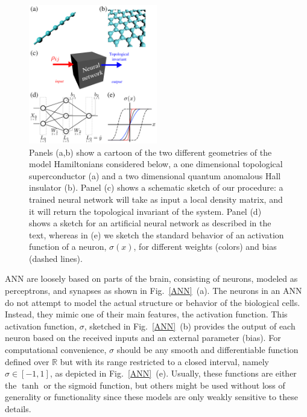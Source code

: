 \begin{figure}[ht!]
\centering
\includegraphics[width=0.5\textwidth]{ann/figures/fig1.pdf}
\vspace{-5pt}
\caption{
Panels (a,b) show a cartoon of the two different geometries of the model Hamiltonians considered  below, 
a one dimensional topological superconductor  (a) and a two dimensional  quantum anomalous Hall insulator (b).
Panel (c) shows a schematic sketch of our procedure: a trained neural network
will take as input a local density matrix, and it will return the topological
invariant of the system.
Panel (d) shows a sketch for an artificial neural network as described in the text, whereas
in (e) we sketch the standard behavior of an activation function of a neuron,
$\sigma(x)$, for different weights (colors) and bias (dashed lines).
}
\label{ANN}
\label{fig1}
\end{figure}

ANN are loosely based on parts of the brain, consisting of neurons, modeled as
perceptrons\cite{Rosenblatt1958}, and synapses as shown in Fig.~\ref{ANN}~(a).
The neurons in an ANN do not attempt to model the actual structure or behavior
of the biological cells\cite{Hodgkin1952}. Instead, they mimic one of their main
features, the activation function.
This activation function, $\sigma$, sketched in Fig.~\ref{ANN}~(b) provides the
output of each neuron based on the received inputs and an external parameter
(bias). For computational convenience, $\sigma$ should be any smooth and
differentiable function defined over $\mathbb{R}$ but with its range restricted
to a closed interval, namely $\sigma\in[-1,1]$, as depicted in Fig.~\ref{ANN}~(e).
Usually, these functions are either the $\tanh$ or the sigmoid function, but
others might be used without loss of generality or functionality since these
models are only weakly sensitive to these details.\cite{Hopfield1982}


